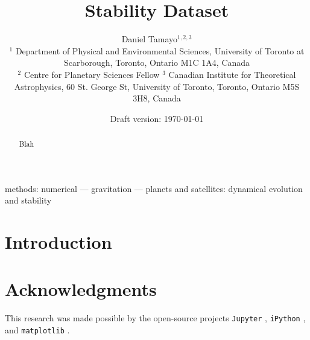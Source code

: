 \documentclass[useAMS,usenatbib,fleqn]{mnras}
\title{Stability Dataset}
\date{Draft version: \today{}}
\author[Daniel Tamayo et al.]{ 
Daniel Tamayo$^{1,2,3}$  
\\
$^1$ Department of Physical and Environmental Sciences, University of Toronto at Scarborough, Toronto, Ontario M1C 1A4, Canada\\
$^2$ Centre for Planetary Sciences Fellow
$^3$ Canadian Institute for Theoretical Astrophysics, 60 St. George St, University of Toronto, Toronto, Ontario M5S 3H8, Canada\\
}
\begin{document}
\maketitle

\begin{abstract}
Blah
\end{abstract}

\begin{keywords}
methods: numerical --- gravitation --- planets and satellites: dynamical evolution and stability 
\end{keywords}


\section{Introduction}
\label{intro}


\section*{Acknowledgments}
This research was made possible by the open-source projects \texttt{Jupyter} \citep{jupyter}, \texttt{iPython} \citep{ipython}, and \texttt{matplotlib} \citep{matplotlib, matplotlib2}.




\end{document}
